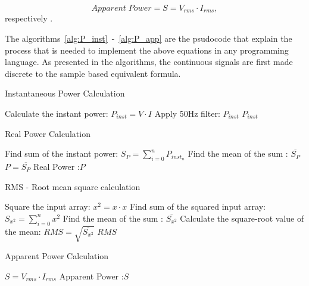 \begin{equation}
    Apparent \; Power = S = V_{rms} \cdot I_{rms} ,
    \label{eq:24}
\end{equation}
respectively \cite{alexander_o._2021}.

The algorithms~\ref{alg:P_inst}~-~\ref{alg:P_app} are the psudocode that explain the process that is needed to implement the above equations in any programming language. As presented in the algorithms, the continuous signals are first made discrete to the sample based equivalent formula.
\begin{algorithm}[H]
\caption{Instantaneous Power Calculation}
\label{alg:P_inst}
\begin{algorithmic}
    \State Calculate the instant power: $P_{inst} = V \cdot I$
    \State Apply 50Hz filter: $P_{inst}$
    \State \Return $P_{inst}$
\EndFunction
\end{algorithmic}
\end{algorithm}


\begin{algorithm}[H]
\caption{Real Power Calculation}
\label{alg:P_real}
\begin{algorithmic}
    \State Find sum of the instant power: $S_{P} = \sum_{i=0}^{n} P_{inst_{n}} $ 
    \State Find the mean of the sum : $\overline {S_{P}}$
    \State $P = \overline {S_{P}}$
    \State \Return Real Power :$P$
\EndFunction
\end{algorithmic}
\end{algorithm}




\begin{algorithm}[H]
\caption{RMS - Root mean square calculation}
\label{alg:RMS}
\begin{algorithmic}
    \State Square the input array: $x^{2} = x \cdot x$
    \State Find sum of the squared input array: $S_{x^{2}} = \sum_{i=0}^{n} x^{2} $ 
    \State Find the mean of the sum : $\overline {S_{x^{2}}}$
    \State Calculate the square-root value of the mean: $RMS = \sqrt{\overline {S_{x^{2}}}}$
    \State \Return $RMS$
\EndFunction
\end{algorithmic}
\end{algorithm}



\begin{algorithm}[H]
\caption{Apparent Power Calculation}
\label{alg:P_app}
\begin{algorithmic}
    \State $S = V_{rms} \cdot I_{rms}$
    \State \Return Apparent Power :$S$
\EndFunction
\end{algorithmic}
\end{algorithm}




